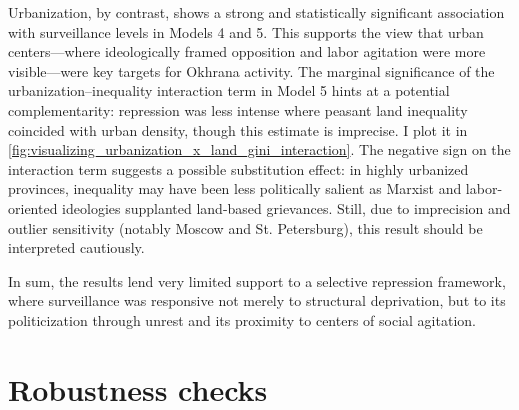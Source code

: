 \documentclass[11pt]{scrarticle}
\begin{document}
Urbanization, by contrast, shows a strong and statistically significant association with surveillance levels in Models 4 and 5. This supports the view that urban centers—where ideologically framed opposition and labor agitation were more visible—were key targets for Okhrana activity. The marginal significance of the urbanization–inequality interaction term in Model 5 hints at a potential complementarity: repression was less intense where peasant land inequality coincided with urban density, though this estimate is imprecise. I plot it in \ref{fig:visualizing_urbanization_x_land_gini_interaction}. The negative sign on the interaction term suggests a possible substitution effect: in highly urbanized provinces, inequality may have been less politically salient as Marxist and labor-oriented ideologies supplanted land-based grievances. Still, due to imprecision and outlier sensitivity (notably Moscow and St. Petersburg), this result should be interpreted cautiously.

In sum, the results lend very limited support to a selective repression framework, where surveillance was responsive not merely to structural deprivation, but to its politicization through unrest and its proximity to centers of social agitation.

\section{Robustness checks}
\end{document}
